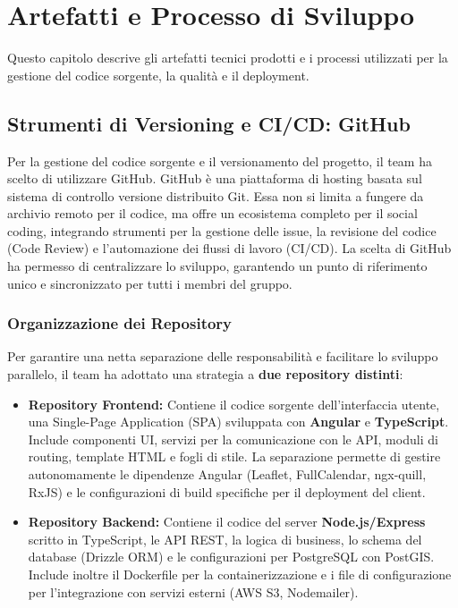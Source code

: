 \chapter{Artefatti e Processo di Sviluppo}
\label{cap:artefatti}

Questo capitolo descrive gli artefatti tecnici prodotti e i processi utilizzati per la gestione del codice sorgente, la qualità e il deployment.

\section{Strumenti di Versioning e CI/CD: GitHub}

Per la gestione del codice sorgente e il versionamento del progetto, il team ha scelto di utilizzare GitHub. GitHub è una piattaforma di hosting basata sul sistema di controllo versione distribuito Git. Essa non si limita a fungere da archivio remoto per il codice, ma offre un ecosistema completo per il social coding, integrando strumenti per la gestione delle issue, la revisione del codice (Code Review) e l'automazione dei flussi di lavoro (CI/CD). La scelta di GitHub ha permesso di centralizzare lo sviluppo, garantendo un punto di riferimento unico e sincronizzato per tutti i membri del gruppo.

\subsection{Organizzazione dei Repository}
Per garantire una netta separazione delle responsabilità e facilitare lo sviluppo parallelo, il team ha adottato una strategia a \textbf{due repository distinti}:

\begin{itemize}
    \item \textbf{Repository Frontend:} Contiene il codice sorgente dell'interfaccia utente, una Single-Page Application (SPA) sviluppata con \textbf{Angular} e \textbf{TypeScript}. Include componenti UI, servizi per la comunicazione con le API, moduli di routing, template HTML e fogli di stile. La separazione permette di gestire autonomamente le dipendenze Angular (Leaflet, FullCalendar, ngx-quill, RxJS) e le configurazioni di build specifiche per il deployment del client.
    
    \item \textbf{Repository Backend:} Contiene il codice del server \textbf{Node.js/Express} scritto in TypeScript, le API REST, la logica di business, lo schema del database (Drizzle ORM) e le configurazioni per PostgreSQL con PostGIS. Include inoltre il Dockerfile per la containerizzazione e i file di configurazione per l'integrazione con servizi esterni (AWS S3, Nodemailer).
\end{itemize}

